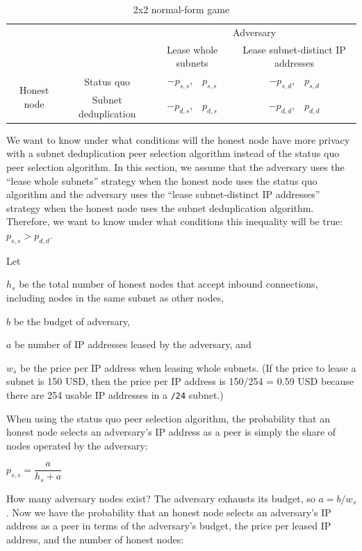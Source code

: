 \documentclass[english]{mrl}
\theoremstyle{plain}
\begin{document}
\begin{table}

\caption{2x2 normal-form game}

\label{table-normal-form-game}

\begin{tabular}{|c|c|c|c|}
\cline{3-4} \cline{4-4} 
\multicolumn{1}{c}{} &  & \multicolumn{2}{c|}{Adversary}\tabularnewline
\cline{3-4} \cline{4-4} 
\multicolumn{1}{c}{} &  & Lease whole subnets & Lease subnet-distinct IP addresses\tabularnewline
\hline 
\multirow{2}{*}{Honest node} & Status quo & $-p_{s,s}$,$\quad$$p_{s,s}$ & $-p_{s,d}$,$\quad$$p_{s,d}$\tabularnewline
\cline{2-4} \cline{3-4} \cline{4-4} 
 & Subnet deduplication & $-p_{d,s}$,$\quad$$p_{d,s}$ & $-p_{d,d}$,$\quad$$p_{d,d}$\tabularnewline
\hline 
\end{tabular}

\end{table}

We want to know under what conditions will the honest node have more
privacy with a subnet deduplication peer selection algorithm instead
of the status quo peer selection algorithm. In this section, we assume
that the adversary uses the ``lease whole subnets'' strategy when
the honest node uses the status quo algorithm and the adversary uses
the ``lease subnet-distinct IP addresses'' strategy when the honest
node uses the subnet deduplication algorithm. Therefore, we want to
know under what conditions this inequality will be true: $p_{s,s}>p_{d,d}$.

Let

$h_{s}$ be the total number of honest nodes that accept inbound connections,
including nodes in the same subnet as other nodes,

$b$ be the budget of adversary,

$a$ be number of IP addresses leased by the adversary, and

$w_{s}$ be the price per IP address when leasing whole subnets. (If
the price to lease a subnet is 150 USD, then the price per IP address
is 150/254 = 0.59 USD because there are 254 usable IP addresses in
a \texttt{/24} subnet.)

When using the status quo peer selection algorithm, the probability
that an honest node selects an adversary's IP address as a peer is
simply the share of nodes operated by the adversary:

$p_{s,s}=\dfrac{a}{h_{s}+a}$

How many adversary nodes exist? The adversary exhausts its budget,
so $a=b/w_{s}$. Now we have the probability that an honest node selects
an adversary's IP address as a peer in terms of the adversary's budget,
the price per leased IP address, and the number of honest nodes:
\end{document}
